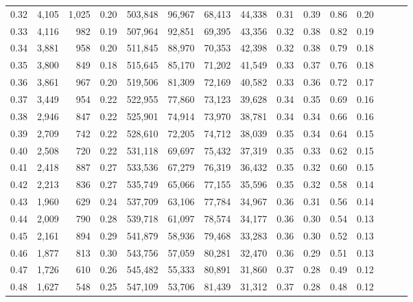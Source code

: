 \begin{tabular}{rrrrrrrrrrrrrrr}
0.32 &   4,105 &  1,025 &  0.20 &  503,848 &   96,967 &   68,413 &   44,338 &  0.31 &  0.39 &  0.86 &      0.20 \\
0.33 &   4,116 &    982 &  0.19 &  507,964 &   92,851 &   69,395 &   43,356 &  0.32 &  0.38 &  0.82 &      0.19 \\
0.34 &   3,881 &    958 &  0.20 &  511,845 &   88,970 &   70,353 &   42,398 &  0.32 &  0.38 &  0.79 &      0.18 \\
0.35 &   3,800 &    849 &  0.18 &  515,645 &   85,170 &   71,202 &   41,549 &  0.33 &  0.37 &  0.76 &      0.18 \\
0.36 &   3,861 &    967 &  0.20 &  519,506 &   81,309 &   72,169 &   40,582 &  0.33 &  0.36 &  0.72 &      0.17 \\
0.37 &   3,449 &    954 &  0.22 &  522,955 &   77,860 &   73,123 &   39,628 &  0.34 &  0.35 &  0.69 &      0.16 \\
0.38 &   2,946 &    847 &  0.22 &  525,901 &   74,914 &   73,970 &   38,781 &  0.34 &  0.34 &  0.66 &      0.16 \\
0.39 &   2,709 &    742 &  0.22 &  528,610 &   72,205 &   74,712 &   38,039 &  0.35 &  0.34 &  0.64 &      0.15 \\
0.40 &   2,508 &    720 &  0.22 &  531,118 &   69,697 &   75,432 &   37,319 &  0.35 &  0.33 &  0.62 &      0.15 \\
0.41 &   2,418 &    887 &  0.27 &  533,536 &   67,279 &   76,319 &   36,432 &  0.35 &  0.32 &  0.60 &      0.15 \\
0.42 &   2,213 &    836 &  0.27 &  535,749 &   65,066 &   77,155 &   35,596 &  0.35 &  0.32 &  0.58 &      0.14 \\
0.43 &   1,960 &    629 &  0.24 &  537,709 &   63,106 &   77,784 &   34,967 &  0.36 &  0.31 &  0.56 &      0.14 \\
0.44 &   2,009 &    790 &  0.28 &  539,718 &   61,097 &   78,574 &   34,177 &  0.36 &  0.30 &  0.54 &      0.13 \\
0.45 &   2,161 &    894 &  0.29 &  541,879 &   58,936 &   79,468 &   33,283 &  0.36 &  0.30 &  0.52 &      0.13 \\
0.46 &   1,877 &    813 &  0.30 &  543,756 &   57,059 &   80,281 &   32,470 &  0.36 &  0.29 &  0.51 &      0.13 \\
0.47 &   1,726 &    610 &  0.26 &  545,482 &   55,333 &   80,891 &   31,860 &  0.37 &  0.28 &  0.49 &      0.12 \\
0.48 &   1,627 &    548 &  0.25 &  547,109 &   53,706 &   81,439 &   31,312 &  0.37 &  0.28 &  0.48 &      0.12 \\

\end{tabular}
